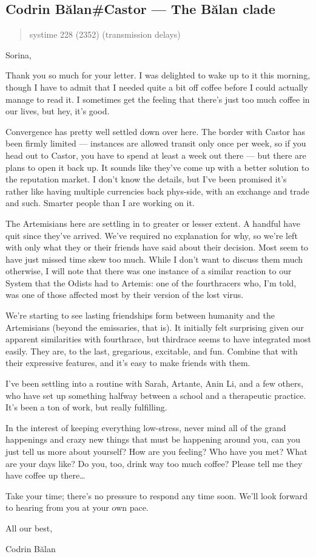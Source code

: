 \hypertarget{codrin-bux103lancastor-the-bux103lan-clade}{%
\subsection{Codrin Bălan\#Castor — The Bălan clade}\label{codrin-bux103lancastor-the-bux103lan-clade}}

\begin{quote}
systime 228 (2352) (transmission delays)
\end{quote}

Sorina,

Thank you so much for your letter. I was delighted to wake up to it this morning, though I have to admit that I needed quite a bit off coffee before I could actually manage to read it. I sometimes get the feeling that there's just too much coffee in our lives, but hey, it's good.

Convergence has pretty well settled down over here. The border with Castor has been firmly limited — instances are allowed transit only once per week, so if you head out to Castor, you have to spend at least a week out there — but there are plans to open it back up. It sounds like they've come up with a better solution to the reputation market. I don't know the details, but I've been promised it's rather like having multiple currencies back phys-side, with an exchange and trade and such. Smarter people than I are working on it.

The Artemisians here are settling in to greater or lesser extent. A handful have quit since they've arrived. We've required no explanation for why, so we're left with only what they or their friends have said about their decision. Most seem to have just missed time skew too much. While I don't want to discuss them much otherwise, I will note that there was one instance of a similar reaction to our System that the Odists had to Artemis: one of the fourthracers who, I'm told, was one of those affected most by their version of the lost virus.

We're starting to see lasting friendships form between humanity and the Artemisians (beyond the emissaries, that is). It initially felt surprising given our apparent similarities with fourthrace, but thirdrace seems to have integrated most easily. They are, to the last, gregarious, excitable, and fun. Combine that with their expressive features, and it's easy to make friends with them.

I've been settling into a routine with Sarah, Artante, Anin Li, and a few others, who have set up something halfway between a school and a therapeutic practice. It's been a ton of work, but really fulfilling.

In the interest of keeping everything low-stress, never mind all of the grand happenings and crazy new things that must be happening around you, can you just tell us more about yourself? How are you feeling? Who have you met? What are your days like? Do you, too, drink way too much coffee? Please tell me they have coffee up there\ldots{}

Take your time; there's no pressure to respond any time soon. We'll look forward to hearing from you at your own pace.

All our best,

Codrin Bălan
